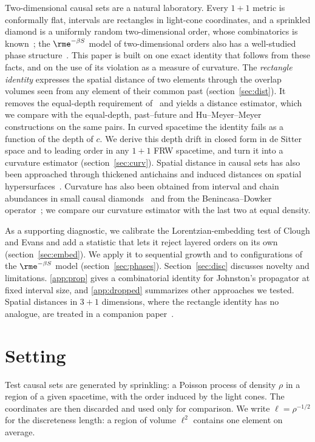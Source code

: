 \documentclass[12pt]{iopart}
\begin{document}
Two-dimensional causal sets are a natural laboratory. Every $1+1$ metric is conformally flat, intervals are rectangles in light-cone coordinates, and a sprinkled diamond is a uniformly random two-dimensional order, whose combinatorics is known~\cite{BHS08,Surya12}; the $\rme^{-\beta S}$ model of two-dimensional orders also has a well-studied phase structure~\cite{BHS08,Surya12,GOS18}. This paper is built on one exact identity that follows from these facts, and on the use of its violation as a measure of curvature. The \emph{rectangle identity} expresses the spatial distance of two elements through the overlap volumes seen from any element of their common past (section~\ref{sec:dist}). It removes the equal-depth requirement of~\cite{BK24} and yields a distance estimator, which we compare with the equal-depth, past--future and Hu--Meyer--Meyer constructions on the same pairs. In curved spacetime the identity fails as a function of the depth of $c$. We derive this depth drift in closed form in de Sitter space and to leading order in any $1+1$ FRW spacetime, and turn it into a curvature estimator (section~\ref{sec:curv}). Spatial distance in causal sets has also been approached through thickened antichains and induced distances on spatial hypersurfaces~\cite{MRS06,MRS07,ESV19}. Curvature has also been obtained from interval and chain abundances in small causal diamonds~\cite{RSS13,KhetrapalSurya13} and from the Benincasa--Dowker operator~\cite{BD10}; we compare our curvature estimator with the last two at equal density.

As a supporting diagnostic, we calibrate the Lorentzian-embedding test of Clough and Evans and add a statistic that lets it reject layered orders on its own (section~\ref{sec:embed}). We apply it to sequential growth and to configurations of the $\rme^{-\beta S}$ model (section~\ref{sec:phases}). Section~\ref{sec:disc} discusses novelty and limitations. \ref{app:prop} gives a combinatorial identity for Johnston's propagator at fixed interval size, and \ref{app:dropped} summarizes other approaches we tested. Spatial distances in $3+1$ dimensions, where the rectangle identity has no analogue, are treated in a companion paper~\cite{Embedding}.

\section{Setting}\label{sec:setting}
Test causal sets are generated by sprinkling: a Poisson process of density $\rho$ in a region of a given spacetime, with the order induced by the light cones. The coordinates are then discarded and used only for comparison. We write $\ell=\rho^{-1/2}$ for the discreteness length: a region of volume $\ell^2$ contains one element on average.
\end{document}
